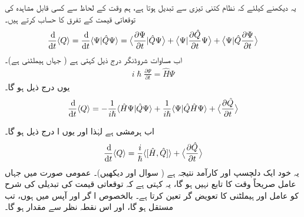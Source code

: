  یہ دیکھنے کیلئے کہ نظام کتنی تیزی سے تبدیل ہوتا ہے، ہم وقت کے لحاظ سے کسی قابل مشاہدہ  کی توقعاتی قیمت کے تفرق کا حساب کرتے ہیں۔ 
\begin{align*}
\frac{\dif}{\dif t} \langle Q \rangle = \frac{\dif}{\dif t} \langle \Psi | \hat{Q} \Psi \rangle = \big\langle \frac{\partial\Psi}{\partial t} \vert \hat{Q} \Psi \big\rangle + \big\langle \Psi \vert \frac{\partial \hat{Q}}{\partial t} \Psi \big\rangle + \big\langle \Psi \vert \hat{Q} \frac{\partial \Psi}{\partial t} \big\rangle 
\end{align*}
اب مساوات شروڈنگر درج ذیل کہتی ہے ( جہاں  ہیملٹنی ہے)۔ 
\begin{align*}
i \hslash \frac{\partial \Psi}{\partial t} = \hat{H} \Psi
\end{align*}
یوں درج ذیل ہو گا۔ 
\begin{align*}
\frac{\dif}{\dif t}\langle Q\rangle =-\frac{1}{i \hslash} \langle \hat{H}\Psi | \hat{Q} \Psi\rangle+\frac{1}{i\hslash}\langle \Psi |\hat{Q} \hat{H} \Psi\rangle +\big \langle \frac{\partial \hat{Q}}{\partial t}\big \rangle
\end{align*}

اب  ہرمشی ہے لہٰذا  اور یوں ا درج ذیل ہو گا۔
\begin{align}\label{مساوات_قواعد_شرح_تبدیلی_قابل_مشاہدہ}
\frac{\dif}{\dif t} \langle Q \rangle = \frac{i}{\hslash} \langle [ \hat{H} , \hat{Q} ] \rangle + \big\langle \frac{\partial \hat{Q}}{\partial t} \big\rangle 
\end{align}
یہ خود ایک دلچسپ اور کارآمد نتیجہ ہے ( سوال  اور  دیکھیں)۔ عمومی صورت میں جہاں عامل صریحاً وقت کا تابع نہیں ہو گا، یہ کہتی ہے کہ توقعاتی قیمت کی تبدیلی کی شرح کو عامل اور ہیملٹنی کا تعویض گر تعین کرتا ہے۔ بالخصوص ا گر  اور  آپس میں ہوں، تب  مستقل ہو گا، اور اس نقطہ نظر سے   مقدار ہو گا۔

